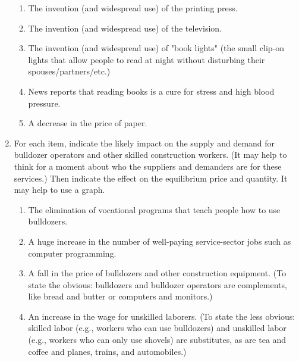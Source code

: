 \begin{enumerate}
    \begin{enumerate}
    \item The invention (and widespread use) of the printing press.
    \item The invention (and widespread use) of the television.
    \item The invention (and widespread use) of "book lights" (the small clip-on lights that allow people to read at night without disturbing their spouses/partners/etc.)
    \item News reports that reading books is a cure for stress and high blood pressure.
    \item A decrease in the price of paper.
    \end{enumerate}









\item For each item, indicate the likely impact on the supply and demand for bulldozer operators and other skilled construction workers. (It may help to think for a moment about who the suppliers and demanders are for these services.) Then indicate the effect on the equilibrium price and quantity. It may help to use a graph.

    \begin{enumerate}
    \item The elimination of vocational programs that teach people how to use bulldozers.
    \item A huge increase in the number of well-paying service-sector jobs such as computer programming.
    \item A fall in the price of bulldozers and other construction equipment. (To state the obvious: bulldozers and bulldozer operators are complements, like bread and butter or computers and monitors.)
    \item An increase in the wage for unskilled laborers. (To state the less obvious: skilled labor (e.g., workers who can use bulldozers) and unskilled labor (e.g., workers who can only use shovels) are substitutes, as are tea and coffee and planes, trains, and automobiles.)
    \end{enumerate}











\end{enumerate}
